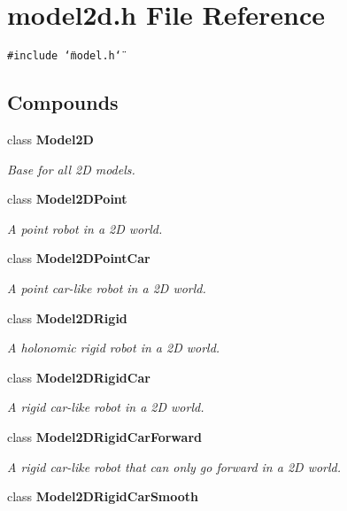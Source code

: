\section{model2d.h File Reference}
\label{model2d_8h}
{\tt \#include \char`\"{}model.h\char`\"{}}\par
\subsection*{Compounds}
\begin{CompactItemize}
\item 
class {\bf Model2D}
\begin{CompactList}\small\item\em Base for all 2D models.\item\end{CompactList}\item 
class {\bf Model2DPoint}
\begin{CompactList}\small\item\em A point robot in a 2D world.\item\end{CompactList}\item 
class {\bf Model2DPoint\-Car}
\begin{CompactList}\small\item\em A point car-like robot in a 2D world.\item\end{CompactList}\item 
class {\bf Model2DRigid}
\begin{CompactList}\small\item\em A holonomic rigid robot in a 2D world.\item\end{CompactList}\item 
class {\bf Model2DRigid\-Car}
\begin{CompactList}\small\item\em A rigid car-like robot in a 2D world.\item\end{CompactList}\item 
class {\bf Model2DRigid\-Car\-Forward}
\begin{CompactList}\small\item\em A rigid car-like robot that can only go forward in a 2D world.\item\end{CompactList}\item 
class {\bf Model2DRigid\-Car\-Smooth}

\end{CompactItemize}
